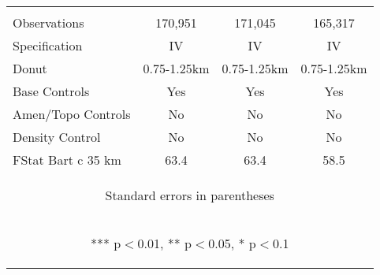 \begin{tabular}{lccc}
\vspace{4pt} & \begin{footnotesize}\end{footnotesize} & \begin{footnotesize}\end{footnotesize} & \begin{footnotesize}\end{footnotesize} \\
Observations & 170,951 & 171,045 & 165,317 \\
Specification & IV & IV & IV \\
Donut & 0.75-1.25km & 0.75-1.25km & 0.75-1.25km \\
Base Controls & Yes & Yes & Yes \\
Amen/Topo Controls & No & No & No \\
Density Control & No & No & No \\
 FStat Bart c 35 km & 63.4 & 63.4 & 58.5 \\ \hline
\multicolumn{4}{c}{\begin{footnotesize} Standard errors in parentheses\end{footnotesize}} \\
\multicolumn{4}{c}{\begin{footnotesize} *** p$<$0.01, ** p$<$0.05, * p$<$0.1\end{footnotesize}} \\
\end{tabular}

